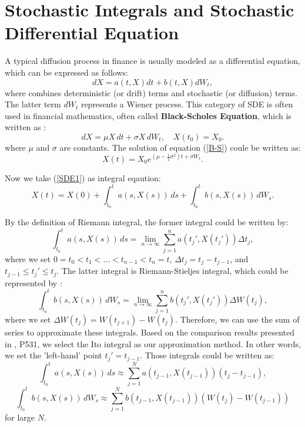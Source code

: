 \documentclass[12pt,a4paper]{article}
\theoremstyle{definition}
\begin{document}
\section{Stochastic Integrals and Stochastic Differential Equation}

A typical diffusion process in finance is usually modeled as a differential equation, which can be expressed as follows\cite{sauer}:
\begin{equation}
    \label{SDE1}
    dX=a(t,X)dt+b(t,X)dW_t,
\end{equation}
where combines deterministic (or drift) terms and stochastic (or diffusion) terms. The latter term $dW_t$ represents a Wiener process. This category of SDE is often used in financial mathematics, often called \textbf{Black-Scholes Equation}, which is written as \cite{sauer}:
\begin{equation}
    \label{B-S} dX=\mu X\, dt+\sigma X\, dW_t,\quad X(t_0)=X_0.
\end{equation}
where $\mu$ and $\sigma$ are constants. The solution of equation (\ref{B-S}) coule be written as:\begin{equation}
    \label{B-Ss} X(t)=X_0e^{(\mu-\frac{1}{2}\sigma^2)t+\sigma W_t}.
\end{equation}

Now we take (\ref{SDE1}) as integral eqaution:
\begin{equation}
    \label{SDE2}
    X(t)=X(0)+\int_{t_0}^t a(s,X(s))\,ds+\int_{t_0}^t b(s,X(s))\, dW_s.
\end{equation}

By the definition of Riemann integral, the former integral could be written by:$$
\int_{t_0}^t a(s,X(s))\,ds=\lim_{n\to\infty}\sum_{j=1}^{n}a(t_j', X(t_j'))\Delta t_j,
$$
where we set $0=t_0<t_1<\dots<t_{n-1}<t_n=t$, $\Delta t_j = t_j-t_{j-1}$, and $t_{j-1}\le t_j'\le t_j$. The latter integral is Riemann-Stieljes integral, which could be represented by \cite{Bullock}:
$$
\int_{t_0}^t b(s,X(s))\, dW_s = \lim_{n\to \infty} \sum_{j=1}^{n}b(t_j', X(t_j'))\Delta W(t_j),
$$
where we set $\Delta W(t_j)=W(t_{j+1})-W(t_j)$. Therefore, we can use the sum of series to approximate these integrals. Based on the comparison results presented in \cite{higham._2001}, P531, we select the Ito integral as our approximation method. In other words, we set the 'left-hand' point $t_j'=t_{j-1}$. Those integrals could be written as:\begin{equation}
\label{3.1}
    \int_{t_0}^t a(s,X(s))\,ds\approx  \sum_{j=1}^{N}a(t_{j-1}, X(t_{j-1}))(t_{j}-t_{j-1}),
\end{equation} 
\begin{equation}
\label{3.2}
    \int_{t_0}^t b(s,X(s))\, dW_s \approx \sum_{j=1}^{N}b(t_{j-1}, X(t_{j-1}))(W(t_{j})-W(t_{j-1}))
\end{equation} 
for large $N$.
\end{document}
